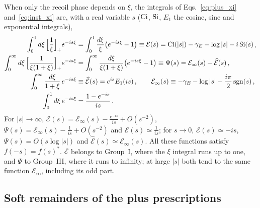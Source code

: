 When only the recoil phase depends on $\xi$, the integrals of Eqs.~\eqref{eq:plus_xi} and~\eqref{eq:inst_xi} are, with a real variable $s$ (${\rm Ci}$, ${\rm Si}$, $E_1$ the cosine, sine and exponential integrals),
\begin{align}\label{eq:recoilfns}
\int_0^1d\xi\,\Big[\frac1\xi\Big]_+e^{-is\xi}&=\int_0^1\frac{d\xi}{\xi}\big(e^{-is\xi}-1\big)\equiv\mathcal E(s)={\rm Ci}(|s|)-\gamma_E-\log|s|-i\,{\rm Si}(s)\,,\notag\\
\int_0^\infty d\xi\,\Big[\frac{1}{\xi(1+\xi)}\Big]_+e^{-is\xi}&=\int_0^\infty\frac{d\xi}{\xi(1+\xi)}\big(e^{-is\xi}-1\big)\equiv\Psi(s)=\mathcal E_\infty(s)-\widehat{\mathcal E}(s)\,,\notag\\
\int_0^\infty\frac{d\xi}{1+\xi}\,e^{-is\xi}&\equiv\widehat{\mathcal E}(s)=e^{is}E_1(is)\,,\qquad
\mathcal E_\infty(s)\equiv-\gamma_E-\log|s|-\frac{i\pi}{2}\,{\rm sgn}(s)\,,\notag\\
\int_0^1d\xi\,e^{-is\xi}&=\frac{1-e^{-is}}{is}\,.
\end{align}
For $|s|\to\infty$, $\mathcal E(s)=\mathcal E_\infty(s)-\frac{e^{-is}}{is}+O(s^{-2})$, $\Psi(s)=\mathcal E_\infty(s)-\frac{1}{is}+O(s^{-2})$ and $\widehat{\mathcal E}(s)\simeq\frac{1}{is}$; for $s\to0$, $\mathcal E(s)\simeq-is$, $\Psi(s)=O(s\log|s|)$ and $\widehat{\mathcal E}(s)\simeq\mathcal E_\infty(s)$. All these functions satisfy $f(-s)=f(s)^*$. $\mathcal E$ belongs to Group~I, where the $\xi$ integral runs up to one, and $\Psi$ to Group~III, where it runs to infinity; at large $|s|$ both tend to the same function $\mathcal E_\infty$, including its odd part.

\subsection{Soft remainders of the plus prescriptions}\label{sec:fin_soft}

